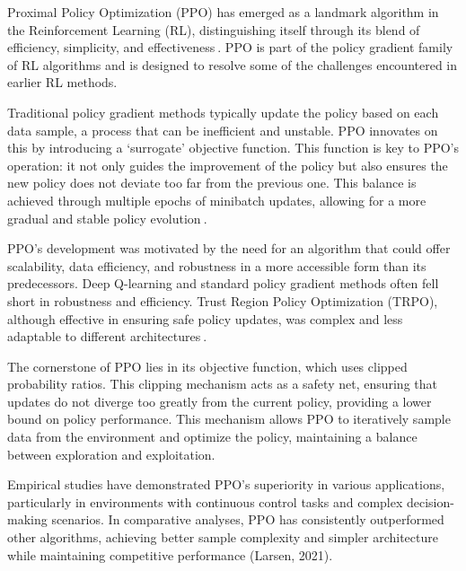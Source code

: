 
Proximal Policy Optimization (PPO) has emerged as a landmark algorithm in the Reinforcement Learning (RL), distinguishing itself through its blend of efficiency, simplicity, and effectiveness$~$\cite{schulman2017ppo}. PPO is part of the policy gradient family of RL algorithms and is designed to resolve some of the challenges encountered in earlier RL methods.

Traditional policy gradient methods typically update the policy based on each data sample, a process that can be inefficient and unstable. PPO innovates on this by introducing a `surrogate' objective function. This function is key to PPO's operation: it not only guides the improvement of the policy but also ensures the new policy does not deviate too far from the previous one. This balance is achieved through multiple epochs of minibatch updates, allowing for a more gradual and stable policy evolution$~$\cite{beznosikov2023stochastic}.

PPO's development was motivated by the need for an algorithm that could offer scalability, data efficiency, and robustness in a more accessible form than its predecessors. Deep Q-learning and standard policy gradient methods often fell short in robustness and efficiency. Trust Region Policy Optimization (TRPO), although effective in ensuring safe policy updates, was complex and less adaptable to different architectures$~$\cite{Engstrom2020Implementation}.

The cornerstone of PPO lies in its objective function, which uses clipped probability ratios. This clipping mechanism acts as a safety net, ensuring that updates do not diverge too greatly from the current policy, providing a lower bound on policy performance. This mechanism allows PPO to iteratively sample data from the environment and optimize the policy, maintaining a balance between exploration and exploitation.

Empirical studies have demonstrated PPO's superiority in various applications, particularly in environments with continuous control tasks and complex decision-making scenarios. In comparative analyses, PPO has consistently outperformed other algorithms, achieving better sample complexity and simpler architecture while maintaining competitive performance (Larsen, 2021).

